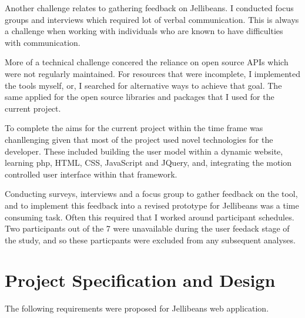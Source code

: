 \documentclass[a4paper, 11pt]{article}
\begin{document}
\vspace{5mm} 
Another challenge relates to gathering feedback on Jellibeans. I conducted focus groups and interviews which required lot of verbal communication. This is always a challenge when working with individuals who are known to have difficulties with communication.

\vspace{5mm}
More of a technical challenge concered the reliance on open source APIs which were not regularly maintained. For resources that were incomplete, I implemented the tools myself, or, I searched for alternative ways to achieve that goal. The same applied for the open source libraries and packages that I used for the current project.

\vspace{5mm}
To complete the aims for the current project within the time frame was chanllenging given that most of the project used novel technologies for the developer. These included building the user model within a dynamic website, learning php, HTML, CSS, JavaScript and JQuery, and, integrating the motion controlled user interface within that framework. 

\vspace{5mm}
Conducting surveys, interviews and a focus group to gather feedback on the tool, and to implement this feedback into a revised prototype for Jellibeans was a time consuming task. Often this required that I worked around participant schedules. Two participants out of the 7 were unavailable during the user feedack stage of the study, and so these particpants were excluded from any subsequent analyses.

\section{Project Specification and Design} 

The following requirements were proposed for Jellibeans web application. 
\end{document}
